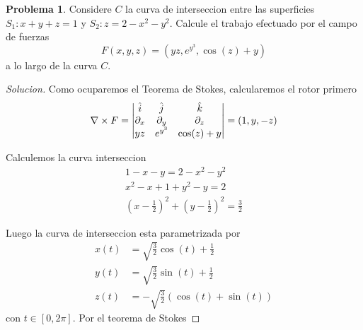 \documentclass{article}
\theoremstyle{definition}
\newtheorem{problem}{Problema}
\newenvironment{solution}{\begin{proof}[Solucion]}{\end{proof}}
\begin{document}
\begin{problem}
  Considere $C$ la curva de interseccion entre las superficies $S_{1}: x + y + z = 1$ y $S_{2} : z = 2 - x^{2} - y^{2}$. Calcule el trabajo efectuado por el campo de fuerzas
  \begin{equation*}
    F(x, y, z) = (yz, e^{y^{3}}, \cos(z) + y)
  \end{equation*}
  a lo largo de la curva $C$.
\end{problem}
\begin{solution}
  Como ocuparemos el Teorema de Stokes, calcularemos el rotor primero
  \begin{equation*}
    \nabla \times F = \begin{vmatrix} \hat{i} & \hat{j} & \hat{k}\\ \partial_x & \partial_y & \partial_z\\ yz & e^{y^{3}} & \cos(z) + y\end{vmatrix} = (1, y, -z)
  \end{equation*}

  Calculemos la curva interseccion
  \begin{gather*}
    1 - x - y = 2 - x^{2} - y^{2}\\
    x^{2} - x + 1 + y^{2} - y = 2\\
    (x - \frac{1}{2})^{2} + (y - \frac{1}{2})^{2} = \frac{3}{2}
  \end{gather*}

  Luego la curva de interseccion esta parametrizada por
  \begin{align*}
    x(t) &= \sqrt{\frac{3}{2}} \cos(t) + \frac{1}{2}\\
    y(t) &= \sqrt{\frac{3}{2}} \sin(t) + \frac{1}{2}\\
    z(t) &= - \sqrt{\frac{3}{2}}(\cos(t) + \sin(t))
  \end{align*}
  con $t \in [0, 2\pi]$. Por el teorema de Stokes
\end{solution}
\end{document}
